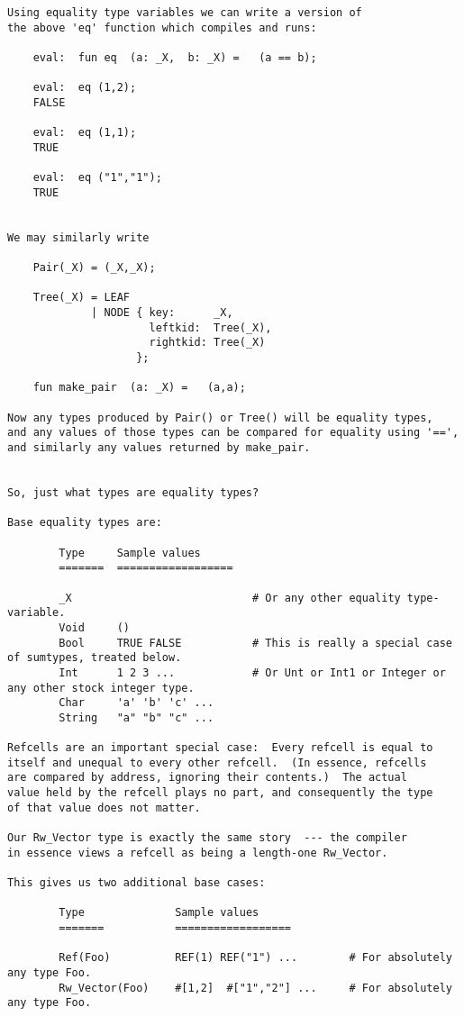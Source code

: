 \begin{verbatim}
Using equality type variables we can write a version of 
the above 'eq' function which compiles and runs: 

    eval:  fun eq  (a: _X,  b: _X) =   (a == b);  

    eval:  eq (1,2);  
    FALSE 

    eval:  eq (1,1); 
    TRUE 

    eval:  eq ("1","1"); 
    TRUE 


We may similarly write 

    Pair(_X) = (_X,_X); 

    Tree(_X) = LEAF 
             | NODE { key:      _X, 
                      leftkid:  Tree(_X), 
                      rightkid: Tree(_X) 
                    }; 

    fun make_pair  (a: _X) =   (a,a); 

Now any types produced by Pair() or Tree() will be equality types, 
and any values of those types can be compared for equality using '==', 
and similarly any values returned by make_pair. 


So, just what types are equality types? 

Base equality types are: 

        Type     Sample values 
        =======  ==================  

        _X                            # Or any other equality type-variable. 
        Void     ()   
        Bool     TRUE FALSE           # This is really a special case of sumtypes, treated below. 
        Int      1 2 3 ...            # Or Unt or Int1 or Integer or any other stock integer type. 
        Char     'a' 'b' 'c' ...   
        String   "a" "b" "c" ...   
 
Refcells are an important special case:  Every refcell is equal to 
itself and unequal to every other refcell.  (In essence, refcells 
are compared by address, ignoring their contents.)  The actual 
value held by the refcell plays no part, and consequently the type 
of that value does not matter. 

Our Rw_Vector type is exactly the same story  --- the compiler 
in essence views a refcell as being a length-one Rw_Vector. 

This gives us two additional base cases: 

        Type              Sample values 
        =======           ==================  

        Ref(Foo)          REF(1) REF("1") ...        # For absolutely any type Foo. 
        Rw_Vector(Foo)    #[1,2]  #["1","2"] ...     # For absolutely any type Foo. 


\end{verbatim}

